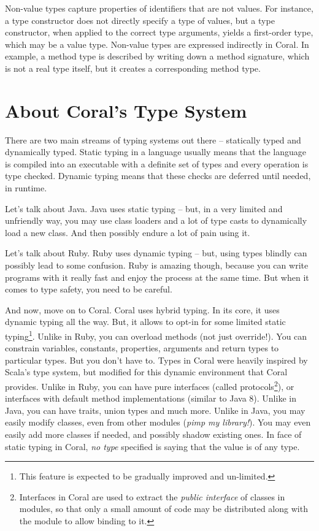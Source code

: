 Non-value types capture properties of identifiers that are not values. For instance, a type constructor does not directly specify a type of values, but a type constructor, when applied to the correct type arguments, yields a first-order type, which may be a value type. Non-value types are expressed indirectly in Coral. In example, a method type is described by writing down a method signature, which is not a real type itself, but it creates a corresponding method type. 






\section{About Coral's Type System}

There are two main streams of typing systems out there -- statically typed and dynamically typed. Static typing in a language usually means that the language is compiled into an executable with a definite set of types and every operation is type checked. Dynamic typing means that these checks are deferred until needed, in runtime. 

Let's talk about Java. Java uses static typing -- but, in a very limited and unfriendly way, you may use class loaders and a lot of type casts to dynamically load a new class. And then possibly endure a lot of pain using it. 

Let's talk about Ruby. Ruby uses dynamic typing -- but, using types blindly can possibly lead to some confusion. Ruby is amazing though, because you can write programs with it really fast and enjoy the process at the same time. But when it comes to type safety, you need to be careful. 

And now, move on to Coral. Coral uses hybrid typing. In its core, it uses dynamic typing all the way. But, it allows to opt-in for some limited static typing\footnote{This feature is expected to be gradually improved and un-limited.}. Unlike in Ruby, you can overload methods (not just override!). You can constrain variables, constants, properties, arguments and return types to particular types. But you don't have to. Types in Coral were heavily inspired by Scala's type system, but modified for this dynamic environment that Coral provides. Unlike in Ruby, you can have pure interfaces (called protocols\footnote{Interfaces in Coral are used to extract the \textit{public interface} of classes in modules, so that only a small amount of code may be distributed along with the module to allow binding to it.}), or interfaces with default method implementations (similar to Java 8). Unlike in Java, you can have traits, union types and much more. Unlike in Java, you may easily modify classes, even from other modules (\textit{pimp my library!}). You may even easily add more classes if needed, and possibly shadow existing ones. In face of static typing in Coral, \textit{no type} specified is saying that the value is of any type. 

